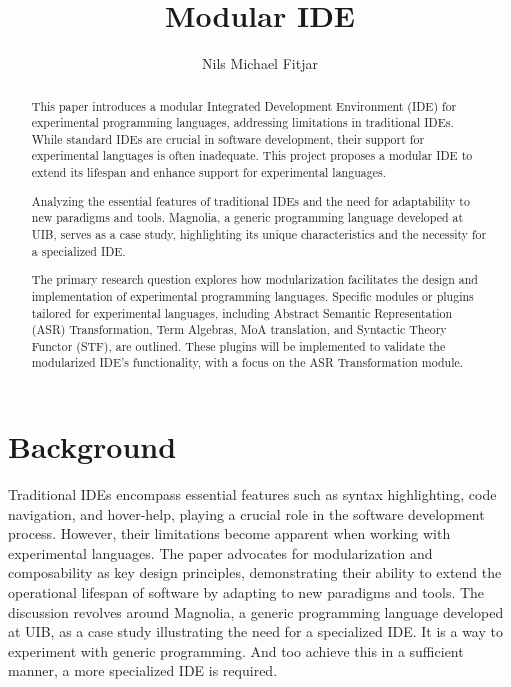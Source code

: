 \documentclass[runningheads]{llncs}
\begin{document}
\title{Modular IDE}

\author{Nils Michael Fitjar
}



\maketitle
\begin{abstract}
This paper introduces a modular Integrated Development Environment (IDE) for experimental programming languages, addressing limitations in traditional IDEs. While standard IDEs are crucial in software development, their support for experimental languages is often inadequate. This project proposes a modular IDE to extend its lifespan and enhance support for experimental languages.

Analyzing the essential features of traditional IDEs and the need for adaptability to new paradigms and tools. Magnolia, a generic programming language developed at UIB, serves as a case study, highlighting its unique characteristics and the necessity for a specialized IDE.

The primary research question explores how modularization facilitates the design and implementation of experimental programming languages. Specific modules or plugins tailored for experimental languages, including Abstract Semantic Representation (ASR) Transformation, Term Algebras, MoA translation, and Syntactic Theory Functor (STF), are outlined. These plugins will be implemented to validate the modularized IDE's functionality, with a focus on the ASR Transformation module.

\end{abstract} 



\section{Background}

Traditional IDEs encompass essential features such as syntax highlighting, code navigation, and hover-help, playing a crucial role in the software development process. However, their limitations become apparent when working with experimental languages. The paper advocates for modularization and composability as key design principles, demonstrating their ability to extend the operational lifespan of software by adapting to new paradigms and tools.
The discussion revolves around Magnolia, a generic programming language developed at UIB, as a case study illustrating the need for a specialized IDE. It is a way to experiment with generic programming. And too achieve this in a sufficient manner, a more specialized IDE is required.
\end{document}
